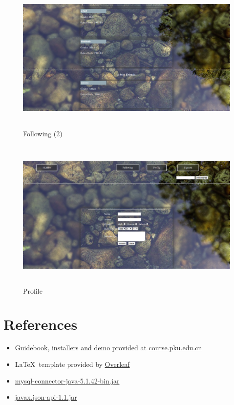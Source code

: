 \begin{figure}[!htbp]
	\begin{center}
		\includegraphics[width=14cm,height=7.5cm]{p4.png}
		\caption{Following (2)}
	\end{center}
\end{figure}
\begin{figure}[!htbp]
	\begin{center}
		\includegraphics[width=14cm,height=7.5cm]{p5.png}
		\caption{Profile}
	\end{center}
\end{figure}

\section{References}

\begin{itemize}
	\item Guidebook, installers and demo provided at \url{course.pku.edu.cn}
	\item \LaTeX \, template provided by \href{https://www.overleaf.com/latex/templates/project-template-titlepage/bwmhgfdvvhpw}{Overleaf}
	\item \href{https://dev.mysql.com/downloads/connector/j/}{mysql-connector-java-5.1.42-bin.jar}
	\item \href{https://mvnrepository.com/artifact/javax.json/javax.json-api/1.1}{javax.json-api-1.1.jar}
\end{itemize}


